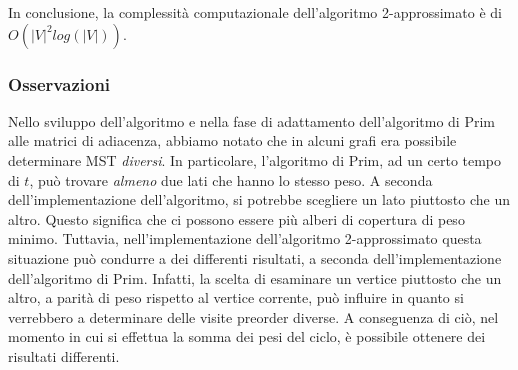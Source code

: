 In conclusione, la complessità computazionale dell'algoritmo 2-approssimato è di $O(|V|^2 log(|V|))$.

\subsubsection{Osservazioni}

Nello sviluppo dell'algoritmo e nella fase di adattamento dell'algoritmo di Prim alle matrici 
di adiacenza, abbiamo notato che in alcuni grafi era possibile determinare 
MST \textit{diversi}. In particolare, l'algoritmo di Prim, ad un certo tempo di $t$, può trovare 
\textit{almeno} due lati che hanno lo stesso peso. A seconda dell'implementazione 
dell'algoritmo, si potrebbe scegliere un lato piuttosto che un altro. Questo significa che 
ci possono essere più alberi di copertura di peso minimo. Tuttavia, nell'implementazione 
dell'algoritmo 2-approssimato questa situazione può condurre a dei differenti risultati, 
a seconda dell'implementazione dell'algoritmo di Prim. Infatti, la scelta di esaminare un 
vertice piuttosto che un altro, a parità di peso rispetto al vertice corrente, può 
influire in quanto si verrebbero a determinare delle visite preorder diverse. A conseguenza 
di ciò, nel momento in cui si effettua la somma dei pesi del ciclo, è possibile ottenere 
dei risultati differenti.
